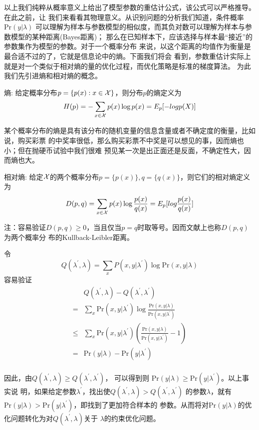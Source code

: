 以上我们纯粹从概率意义上给出了模型参数的重估计公式，该公式可以严格推导。在此之前，让
我们来看看其物理意义。从识别问题的分析我们知道，条件概率$\mbox{Pr}(y
| \lambda)$
可以理解为样本与参数模型的相似度，而其负对数可以理解为样本与参数模型的某种距离(Bayes距离)；
那么在已知样本下，应该选择与样本最“接近”的参数集作为模型的参数。对于一个概率分布
来说，以这个距离的均值作为衡量是最合适不过的了，它就是信息论中的熵。下面我们将会
看到，参数重估计实际上就是对一个类似于相对熵的量的优化过程，而优化策略是标准的梯度算法。
为此我们先引进熵和相对熵的概念。

熵: 给定概率分布$p=\{p(x): x \in {\cal X}
\}$，则分布$p$的熵定义为
$$
    H(p)=-\sum\limits_{x \in {\cal X}} p(x) \log p(x)=E_{p}[ -log p(X)]
$$

某个概率分布的熵是具有该分布的随机变量的信息含量或者不确定度的衡量，比如说，购买彩票
的中奖率很低，那么购买彩票不中奖是可以想见的事，因而熵也小；但在抛硬币试验中我们很难
预见某一次是出正面还是反面，不确定性大，因而熵也大。

相对熵: 给定${\cal X}$的两个概率分布$p=\{p(x)\}, q=\{
q(x) \} $，则它们的相对熵定义为
$$
D(p,q)=\sum\limits_{x \in {\cal X}} p(x) \log
\frac{p(x)}{q(x)}=E_{p}[log \frac{p(x)}{q(x)}]
$$

\noindent 注：容易验证$D(p,q) \geq
0$，当且仅当$p=q$时取等号。因而文献上也称$D(p,q)$为两个概率分
布的Kullback-Leibler距离。

令
$$
   Q(\lambda^{\prime},\lambda)
=\sum\limits_{x} P(x,y | \lambda^{\prime}) \log \mbox{Pr}(x,y |
\lambda)
$$
容易验证
$$
   \begin{aligned}
  &Q(\lambda^{\prime},\lambda) - Q(\lambda^{\prime},\lambda^{\prime})\\
 =&\sum\limits_{x} \mbox{Pr}(x,y | \lambda^{\prime}) \log
    \frac{\mbox{Pr}(x,y | \lambda )}{\mbox{Pr}(x,y | \lambda^{\prime})}\\
     \leq & \sum\limits_{x} \mbox{Pr}(x,y | \lambda^{\prime})
       (\frac{\mbox{Pr}(x,y | \lambda) }{\mbox{Pr}(x,y | \lambda^{\prime})}-1)\\
 =&\mbox{Pr}(y | \lambda)- \mbox{Pr}(y | \lambda^{\prime})\\
\end{aligned}
$$

因此，由$Q(\lambda^{\prime},\lambda) \geq
Q(\lambda^{\prime},\lambda^{\prime})$， 可以得到则 $\mbox{Pr}(y |
\lambda) \geq \mbox{Pr}(y | \lambda^{\prime})$。以上事实说
明，如果给定参数$\lambda^{\prime}$，找出使$Q(\lambda^{\prime},\lambda)>Q(\lambda^{\prime},\lambda^{\prime})$
的参数$\lambda$，就有$\mbox{Pr}(y | \lambda)>\mbox{Pr}(y
|\lambda^{\prime})$，即找到了更加符合样本的
参数。从而将对$\mbox{Pr}(y |
\lambda)$的优化问题转化为对$Q(\lambda^{\prime},\lambda)$关于
$\lambda$的约束优化问题。

